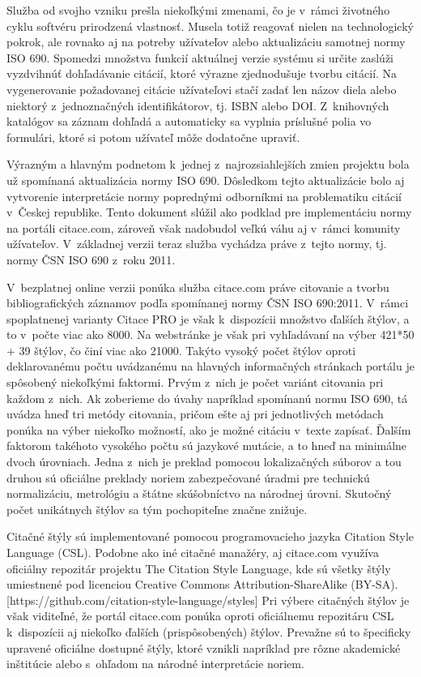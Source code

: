 \documentclass{fithesis3}
\begin{document}
	Služba od svojho vzniku prešla niekoľkými zmenami, čo je v~rámci životného cyklu softvéru prirodzená vlastnosť. Musela totiž reagovať nielen na technologický pokrok, ale rovnako aj na potreby užívateľov alebo aktualizáciu samotnej normy ISO 690. Spomedzi množstva funkcií aktuálnej verzie systému si určite zaslúži vyzdvihnúť dohľadávanie citácií, ktoré výrazne zjednodušuje tvorbu citácií. Na vygenerovanie požadovanej citácie užívateľovi stačí zadať len názov diela alebo niektorý z~jednoznačných identifikátorov, tj. ISBN alebo DOI. Z~knihovných katalógov sa záznam dohľadá a automaticky sa vyplnia príslušné polia vo formulári, ktoré si potom užívateľ môže dodatočne upraviť.

	Výrazným a hlavným podnetom k~jednej z~najrozsiahlejších zmien projektu bola už spomínaná aktualizácia normy ISO 690. Dôsledkom tejto aktualizácie bolo aj vytvorenie interpretácie normy poprednými odborníkmi na problematiku citácií v~Českej republike. Tento dokument slúžil ako podklad pre implementáciu normy na portáli citace.com, zároveň však nadobudol veľkú váhu aj v~rámci komunity užívateľov. V~základnej verzii teraz služba vychádza práve z~tejto normy, tj. normy ČSN ISO 690 z~roku 2011.
	
	V~bezplatnej online verzii ponúka služba citace.com práve citovanie a tvorbu bibliografických záznamov podľa spomínanej normy ČSN ISO 690:2011. V~rámci spoplatnenej varianty Citace PRO je však k~dispozícii množstvo ďalších štýlov, a to v~počte viac ako 8000. Na webstránke je však pri vyhľadávaní na výber 421*50 + 39 štýlov, čo činí viac ako 21000. Takýto vysoký počet štýlov oproti deklarovanému počtu uvádzanému na hlavných informačných stránkach portálu je spôsobený niekoľkými faktormi. Prvým z~nich je počet variánt citovania pri každom z~nich. Ak zoberieme do úvahy napríklad spomínanú normu ISO 690, tá uvádza hneď tri metódy citovania, pričom ešte aj pri jednotlivých metódach ponúka na výber niekoľko možností, ako je možné citáciu v~texte zapísať. Ďalším faktorom takéhoto vysokého počtu sú jazykové mutácie, a to hneď na minimálne dvoch úrovniach. Jedna z~nich je preklad pomocou lokalizačných súborov a tou druhou sú oficiálne preklady noriem zabezpečované úradmi pre technickú normalizáciu, metrológiu a štátne skúšobníctvo na národnej úrovni. Skutočný počet unikátnych štýlov sa tým pochopiteľne značne znižuje.
	
	Citačné štýly sú implementované pomocou programovacieho jazyka Citation Style Language (CSL). Podobne ako iné citačné manažéry, aj citace.com využíva oficiálny repozitár projektu The Citation Style Language, kde sú všetky štýly umiestnené pod licenciou Creative Commons Attribution-ShareAlike (BY-SA). [https://github.com/citation-style-language/styles] Pri výbere citačných štýlov je však viditeľné, že portál citace.com ponúka oproti oficiálnemu repozitáru CSL k~dispozícii aj niekoľko ďalších (prispôsobených) štýlov. Prevažne sú to špecificky upravené oficiálne dostupné štýly, ktoré vznikli napríklad pre rôzne akademické inštitúcie alebo s~ohľadom na národné interpretácie noriem.
	
\end{document}
